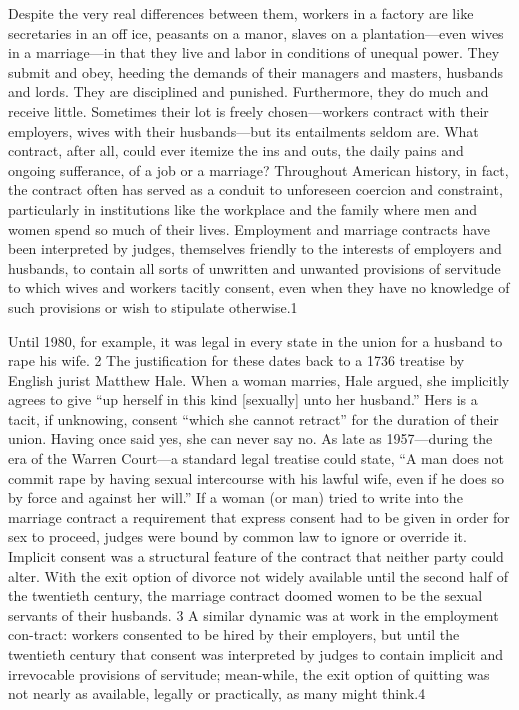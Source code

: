 Despite the very real differences between them, workers in a factory are like secretaries in an off ice, peasants on a manor, slaves on a plantation—even wives in a marriage—in that they live and labor in conditions of unequal power. They submit and obey, heeding the demands of their managers and masters, husbands and lords. They are disciplined and punished. Furthermore, they do much and receive little. Sometimes their lot is freely chosen—workers contract with their employers, wives with their husbands—but its entailments seldom are. What contract, after all, could ever itemize the ins and outs, the daily pains and ongoing sufferance, of a job or a marriage? Throughout American history, in fact, the contract often has served as a conduit to unforeseen coercion and constraint, particularly in institutions like the workplace and the family where men and women spend so much of their lives. Employment and marriage contracts have been interpreted by judges, themselves friendly to the interests of employers and husbands, to contain all sorts of unwritten and unwanted provisions of servitude to which wives and workers tacitly consent, even when they have no knowledge of such provisions or wish to stipulate otherwise.{\color{blue}1}
 \par 
Until 1980, for example, it was legal in every state in the union for a husband to rape his wife. {\color{blue}2} The justification for these dates back to a 1736 treatise by English jurist Matthew Hale. When a woman marries, Hale argued, she implicitly agrees to give “up herself in this kind [sexually] unto her husband.” Hers is a tacit, if unknowing, consent “which she cannot retract” for the duration of their union. Having once said yes, she can never say no. As late as 1957—during the era of the Warren Court—a standard legal treatise could state, “A man does not commit rape by having sexual intercourse with his lawful wife, even if he does so by force and against her will.” If a woman (or man) tried to write into the marriage contract a requirement that express consent had to be given in order for sex to proceed, judges were bound by common law to ignore or override it. Implicit consent was a structural feature of the contract that neither party could alter. With the exit option of divorce not widely available until the second half of the twentieth century, the marriage contract doomed women to be the sexual servants of their husbands. {\color{blue}3} A similar dynamic was at work in the employment con-tract: workers consented to be hired by their employers, but until the twentieth century that consent was interpreted by judges to contain implicit and irrevocable provisions of servitude; mean-while, the exit option of quitting was not nearly as available, legally or practically, as many might think.{\color{blue}4}

